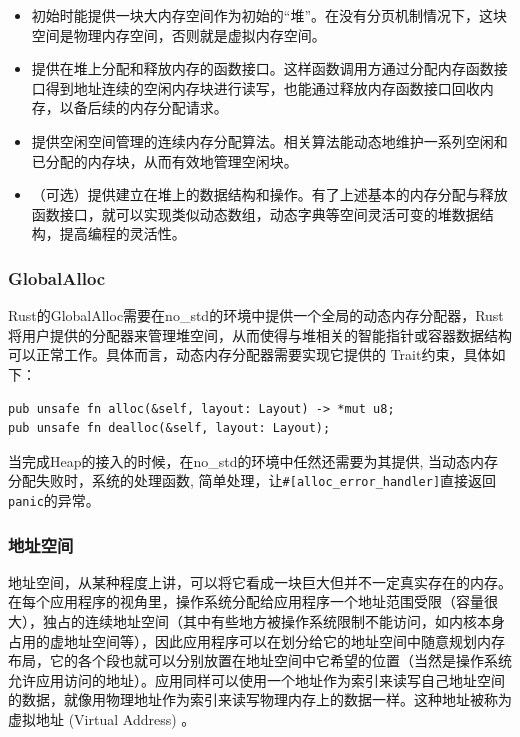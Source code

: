 \begin{itemize}
\item 初始时能提供一块大内存空间作为初始的“堆”。在没有分页机制情况下，这块空间是物理内存空间，否则就是虚拟内存空间。
\item 提供在堆上分配和释放内存的函数接口。这样函数调用方通过分配内存函数接口得到地址连续的空闲内存块进行读写，也能通过释放内存函数接口回收内存，以备后续的内存分配请求。
\item 提供空闲空间管理的连续内存分配算法。相关算法能动态地维护一系列空闲和已分配的内存块，从而有效地管理空闲块。
\item （可选）提供建立在堆上的数据结构和操作。有了上述基本的内存分配与释放函数接口，就可以实现类似动态数组，动态字典等空间灵活可变的堆数据结构，提高编程的灵活性。
\end{itemize}

\subsubsection{GlobalAlloc}
Rust的GlobalAlloc需要在no\_std的环境中提供一个全局的动态内存分配器，Rust将用户提供的分配器来管理堆空间，从而使得与堆相关的智能指针或容器数据结构可以正常工作。具体而言，动态内存分配器需要实现它提供的 Trait约束，具体如下：

\begin{lstlisting}[caption=GlobalAlloc的Trait约束]
pub unsafe fn alloc(&self, layout: Layout) -> *mut u8;
pub unsafe fn dealloc(&self, layout: Layout);
\end{lstlisting}

当完成Heap的接入的时候，在no\_std的环境中任然还需要为其提供, 当动态内存分配失败时，系统的处理函数, 简单处理，让\verb|#[alloc_error_handler]|直接返回\verb|panic|的异常。

\subsubsection{地址空间}

地址空间，从某种程度上讲，可以将它看成一块巨大但并不一定真实存在的内存。在每个应用程序的视角里，操作系统分配给应用程序一个地址范围受限（容量很大），独占的连续地址空间（其中有些地方被操作系统限制不能访问，如内核本身占用的虚地址空间等），因此应用程序可以在划分给它的地址空间中随意规划内存布局，它的各个段也就可以分别放置在地址空间中它希望的位置（当然是操作系统允许应用访问的地址）。应用同样可以使用一个地址作为索引来读写自己地址空间的数据，就像用物理地址作为索引来读写物理内存上的数据一样。这种地址被称为 虚拟地址 (Virtual Address) 。


